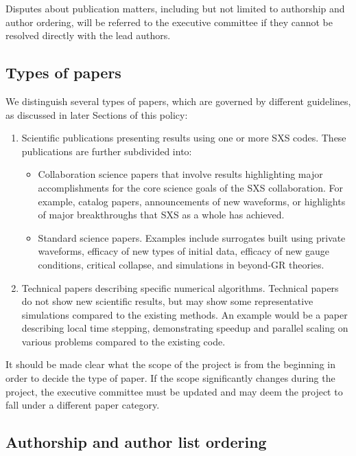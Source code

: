 \documentclass[12pt]{article}
\begin{document}
Disputes about publication matters, including but not limited to
authorship and author ordering, will be referred to the executive
committee if they cannot be resolved directly with the lead authors.

\subsection{Types of papers}

We distinguish several types of papers, which are governed by different
guidelines, as discussed in later Sections of this policy:
\begin{enumerate}
\setlength\itemsep{-0.25em}
\item Scientific publications presenting results using one or more SXS
  codes. These publications are further subdivided into:
  \begin{itemize}
    \setlength\itemsep{-0.25em}
  \item Collaboration science papers that involve results highlighting
    major accomplishments for the core science goals of the SXS
    collaboration. For example, catalog papers, announcements of new
    waveforms, or highlights of major breakthroughs that SXS as a
    whole has achieved.
  \item Standard science papers. Examples include surrogates built
    using private waveforms, efficacy of new types of initial data,
    efficacy of new gauge conditions, critical collapse, and
    simulations in beyond-GR theories.
  \end{itemize}
  
\item Technical papers describing specific numerical
  algorithms. Technical papers do not show new scientific results, but
  may show some representative simulations compared to the existing
  methods. An example would be a paper describing local time stepping,
  demonstrating speedup and parallel scaling on various problems
  compared to the existing code.
\end{enumerate}

It should be made clear what the scope of the project is from the
beginning in order to decide the type of paper.  If the scope
significantly changes during the project, the executive committee must
be updated and may deem the project to fall under a different paper
category.

\subsection{Authorship and author list ordering}
\end{document}
